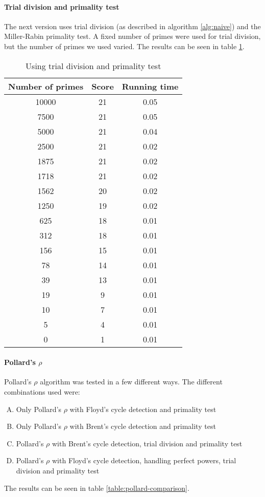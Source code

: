 \paragraph{Trial division and primality test}
The next version uses trial division (as described in algorithm
\ref{alg:naive}) and the Miller-Rabin primality test. A fixed number of primes were
used for trial division, but the number of primes we used varied. 
The results can be seen in table \ref{table:trial}.

\begin{table}[h!]
    \centering
    \begin{tabular}{|c|c|c|}
    \hline
    \textbf{Number of primes} & \textbf{Score} & \textbf{Running time} \\ \hline
    10000 & 21 & 0.05 \\ \hline
    7500  & 21 & 0.05 \\ \hline
    5000  & 21 & 0.04 \\ \hline
    2500  & 21 & 0.02 \\ \hline
    1875  & 21 & 0.02 \\ \hline
    1718  & 21 & 0.02 \\ \hline 
    1562  & 20 & 0.02 \\ \hline 
    1250  & 19 & 0.02 \\ \hline
    625   & 18 & 0.01 \\ \hline
    312   & 18 & 0.01 \\ \hline
    156   & 15 & 0.01 \\ \hline
    78    & 14 & 0.01 \\ \hline
    39    & 13 & 0.01 \\ \hline
    19    & 9  & 0.01 \\ \hline
    10    & 7  & 0.01 \\ \hline
    5     & 4  & 0.01 \\ \hline
    0     & 1  & 0.01 \\ \hline
    \end{tabular}
    \caption{Using trial division and primality test}
    \label{table:trial}
\end{table}


\paragraph{Pollard's $\rho$}
Pollard's $\rho$ algorithm was tested in a few different ways. The different
combinations used were:
\begin{enumerate}[A)]
    \item Only Pollard's $\rho$ with Floyd's cycle detection and primality test
    \item Only Pollard's $\rho$ with Brent's cycle detection and primality test
    \item Pollard's $\rho$ with Brent's cycle detection, trial division and 
          primality test
    \item Pollard's $\rho$ with Floyd's cycle detection, handling perfect
          powers, trial division and primality test
\end{enumerate}
The results can be seen in table \ref{table:pollard-comparison}.

